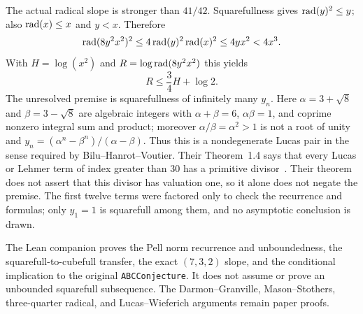 The actual radical slope is stronger than $41/42$.  Squarefullness gives
$\operatorname{rad}(y)^2\leq y$; also $\operatorname{rad}(x)\leq x$ and $y<x$.  Therefore
\[
 \operatorname{rad}(8y^2x^2)^2
 \leq4\operatorname{rad}(y)^2\operatorname{rad}(x)^2
 \leq4yx^2<4x^3.
\]
With $H=\log(x^2)$ and $R=\log\operatorname{rad}(8y^2x^2)$ this yields
\begin{equation}\label{eq:pell-three-quarter-slope}
                         R\leq\frac34H+\log2.
\end{equation}
The unresolved premise is squarefullness of infinitely many $y_n$.
Here $\alpha=3+\sqrt8$ and $\beta=3-\sqrt8$ are algebraic integers with
$\alpha+\beta=6$, $\alpha\beta=1$, and coprime nonzero integral sum and
product; moreover $\alpha/\beta=\alpha^2>1$ is not a root of unity and
$y_n=(\alpha^n-\beta^n)/(\alpha-\beta)$.  Thus this is a nondegenerate Lucas
pair in the sense required by Bilu--Hanrot--Voutier.  Their Theorem~1.4 says
that every Lucas or Lehmer term of index greater than $30$ has a primitive
divisor~\cite{BHV2001}.  Their theorem does not assert that this divisor has
valuation one, so it alone does not negate the premise.  The first
twelve terms were factored only to check the recurrence and formulas; only
$y_1=1$ is squarefull among them, and no asymptotic conclusion is drawn.

The Lean companion proves the Pell norm recurrence and unboundedness, the
squarefull-to-cubefull transfer, the exact $(7,3,2)$ slope, and the conditional
implication to the original \texttt{ABCConjecture}.  It does not assume or prove an
unbounded squarefull subsequence.  The Darmon--Granville, Mason--Stothers,
three-quarter radical, and Lucas--Wieferich arguments remain paper proofs.
